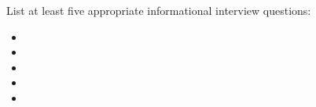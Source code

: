 

List at least five appropriate informational interview questions:

\begin{itemize}
\item{} 
\vskip 30pt
\item{} 
\vskip 30pt
\item{} 
\vskip 30pt
\item{} 
\vskip 30pt
\item{} 
\vskip 30pt
\end{itemize}














